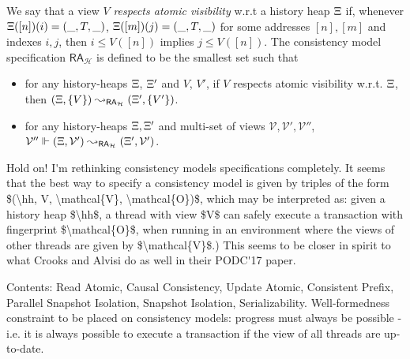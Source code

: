\begin{definition}
We say that a view $V$ \emph{respects atomic visibility} w.r.t a history heap $\hh$ if, 
whenever $\Xi([n])(i) = (\_, T, \_)$, $\Xi([m])(j) = (\_, T, \_)$ for some addresses 
$[n], [m]$ and indexes $i, j$,  then $i \leq V([n])$ implies $j \leq V([n])$.
The consistency model specification $\mathsf{RA}_{\mathcal{H}}$ is defined to be the smallest set 
such that 
\begin{itemize}
\item for any history-heaps $\hh$, $\Xi'$ and  $V$, $V'$, if $V$ respects atomic visibility w.r.t. 
$\hh$, then $(\Xi, \{V\}) \leadsto_{\mathsf{RA}_{\mathcal{H}}} (\Xi', \{V'\})$.
\item for any history-heaps $\Xi,\Xi'$ and  multi-set of views $\mathcal{V}, \mathcal{V}', 
\mathcal{V}''$, $\mathcal{V}'' \Vdash (\Xi, \mathcal{V}') \leadsto_{\mathsf{RA}_{\mathcal{H}}} 
(\Xi', \mathcal{V}')$.  
\end{itemize}
\ac{Hold on! I'm rethinking consistency models specifications completely. It seems that 
the best way to specify a consistency model is given by triples of the form 
$(\hh, V, \mathcal{V}, \mathcal{O})$, which may be interpreted as: 
given a history heap $\hh$, a thread with view $V$ can safely execute a transaction 
with fingerprint $\mathcal{O}$, when running in an environment where the views 
of other threads are given by $\mathcal{V}$.) This seems to be closer in spirit 
to what Crooks and Alvisi do as well in their PODC'17 paper.}

\end{definition}

\ac{Contents: Read Atomic, Causal Consistency, Update Atomic, Consistent Prefix, Parallel Snapshot Isolation, Snapshot Isolation, 
Serializability. Well-formedness constraint to be placed on consistency models: progress must always be possible - i.e. it is 
always possible to execute a transaction if the view of all threads are up-to-date.}  